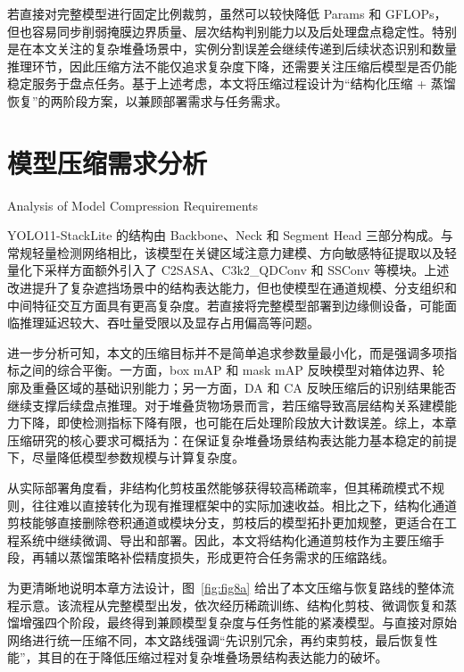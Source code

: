 若直接对完整模型进行固定比例裁剪，虽然可以较快降低 Params 和 GFLOPs，但也容易同步削弱掩膜边界质量、层次结构判别能力以及后处理盘点稳定性。特别是在本文关注的复杂堆叠场景中，实例分割误差会继续传递到后续状态识别和数量推理环节，因此压缩方法不能仅追求复杂度下降，还需要关注压缩后模型是否仍能稳定服务于盘点任务。基于上述考虑，本文将压缩过程设计为“结构化压缩 + 蒸馏恢复”的两阶段方案，以兼顾部署需求与任务需求。

\section{模型压缩需求分析}{Analysis of Model Compression Requirements}

YOLO11-StackLite 的结构由 Backbone、Neck 和 Segment Head 三部分构成。与常规轻量检测网络相比，该模型在关键区域注意力建模、方向敏感特征提取以及轻量化下采样方面额外引入了 C2SASA、C3k2\_QDConv 和 SSConv 等模块。上述改进提升了复杂遮挡场景中的结构表达能力，但也使模型在通道规模、分支组织和中间特征交互方面具有更高复杂度。若直接将完整模型部署到边缘侧设备，可能面临推理延迟较大、吞吐量受限以及显存占用偏高等问题。

进一步分析可知，本文的压缩目标并不是简单追求参数量最小化，而是强调多项指标之间的综合平衡。一方面，box mAP 和 mask mAP 反映模型对箱体边界、轮廓及重叠区域的基础识别能力；另一方面，DA 和 CA 反映压缩后的识别结果能否继续支撑后续盘点推理。对于堆叠货物场景而言，若压缩导致高层结构关系建模能力下降，即使检测指标下降有限，也可能在后处理阶段放大计数误差。综上，本章压缩研究的核心要求可概括为：在保证复杂堆叠场景结构表达能力基本稳定的前提下，尽量降低模型参数规模与计算复杂度。

从实际部署角度看，非结构化剪枝虽然能够获得较高稀疏率，但其稀疏模式不规则，往往难以直接转化为现有推理框架中的实际加速收益\cite{han2015learning,han2016deepcompression}。相比之下，结构化通道剪枝能够直接删除卷积通道或模块分支，剪枝后的模型拓扑更加规整，更适合在工程系统中继续微调、导出和部署。因此，本文将结构化通道剪枝作为主要压缩手段，再辅以蒸馏策略补偿精度损失，形成更符合任务需求的压缩路线。

为更清晰地说明本章方法设计，图~\ref{fig:fig8a} 给出了本文压缩与恢复路线的整体流程示意。该流程从完整模型出发，依次经历稀疏训练、结构化剪枝、微调恢复和蒸馏增强四个阶段，最终得到兼顾模型复杂度与任务性能的紧凑模型。与直接对原始网络进行统一压缩不同，本文路线强调“先识别冗余，再约束剪枝，最后恢复性能”，其目的在于降低压缩过程对复杂堆叠场景结构表达能力的破坏。

